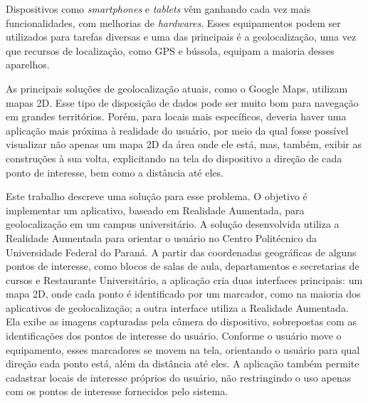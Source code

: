 Dispositivos como \textit{smartphones} e \textit{tablets} vêm ganhando cada vez mais funcionalidades, com 
melhorias de \textit{hardwares}. Esses equipamentos podem ser utilizados para tarefas diversas e uma das
principais é a geolocalização, uma vez que recursos de localização, como \gls{GPS} e bússola, equipam a 
maioria desses aparelhos.

As principais soluções de geolocalização atuais, como o Google Maps, utilizam mapas 2D. Esse tipo de 
disposição de dados pode ser muito bom para navegação em grandes territórios. Porém, para locais mais
específicos, deveria haver uma aplicação mais próxima à realidade do usuário, por meio da qual fosse 
possível visualizar não apenas um mapa 2D da área onde ele está, mas, também, exibir as construções 
à sua volta, explicitando na tela do dispositivo a direção de cada ponto de interesse, bem como a distância
até eles.

Este trabalho descreve uma solução para esse problema. O objetivo é implementar um aplicativo, baseado em 
Realidade Aumentada, para geolocalização em 
um campus universitário. A solução desenvolvida utiliza a Realidade Aumentada para orientar o
usuário no Centro Politécnico da Universidade Federal do Paraná. A partir das coordenadas geográficas de alguns 
pontos de interesse, como blocos de salas de aula, departamentos e secretarias de cursos e Restaurante Universitário, 
a aplicação cria duas interfaces principais: um mapa 2D, onde cada ponto é identificado por um marcador, como na maioria
dos aplicativos de geolocalização; a outra interface utiliza a Realidade Aumentada. Ela exibe as imagens capturadas pela
câmera do dispositivo, sobrepostas com as identificações dos pontos de interesse do usuário. Conforme o usuário move o
equipamento, esses marcadores se movem na tela, orientando o usuário para qual direção cada ponto está, além da distância
até eles. A aplicação também permite cadastrar locais de interesse próprios do usuário, não restringindo o uso apenas com os
pontos de interesse fornecidos pelo sistema.









